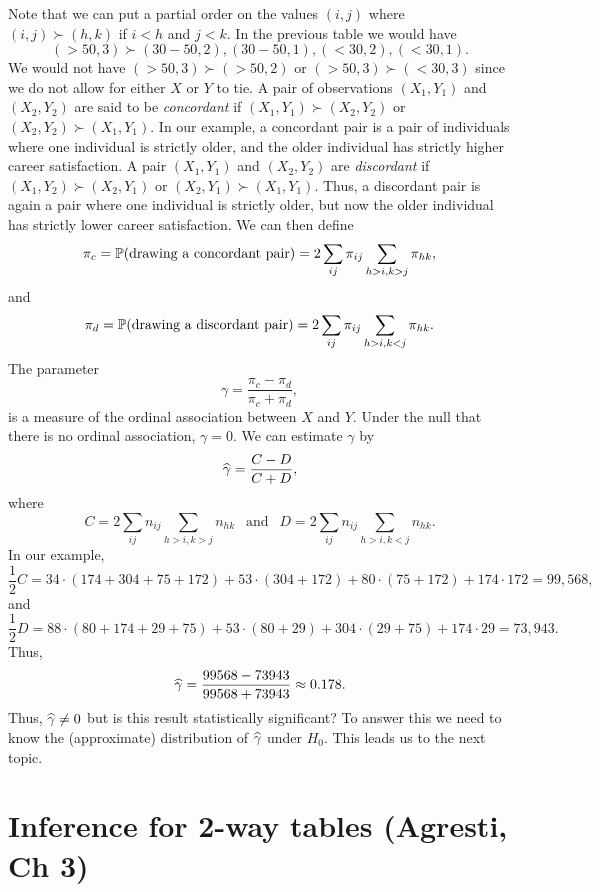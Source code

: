 Note that we can put a partial order on the values $(i,j)$ where $(i,j) \succ (h,k)$ if $i < h$ and $j < k$. In the previous table we would have 
\[(>50,3) \succ (30-50, 2), (30-50, 1), (<30, 2), (<30, 1). \]
We would not have $(>50,3) \succ (>50,2)$ or $(>50,3) \succ (<30,3)$ since we do not allow for either $X$ or $Y$ to tie. A pair of observations $(X_1,Y_1)$ and $(X_2,Y_2)$ are said to be \emph{concordant} if $(X_1,Y_1) \succ (X_2,Y_2)$ or $(X_2, Y_2) \succ (X_1,Y_1)$. In our example, a concordant pair is a pair of individuals where one individual is strictly older, and the older individual has strictly higher career satisfaction. A pair $(X_1,Y_1)$ and $(X_2,Y_2)$ are \emph{discordant} if $(X_1,Y_2) \succ (X_2, Y_1)$  or $(X_2, Y_1) \succ (X_1,Y_1)$. Thus, a discordant pair is again a pair where one individual is strictly older, but now the older individual has strictly lower career satisfaction. We can then define
\[\pi_c = {\mathbb{P}}(\text{drawing a concordant pair}) = 2\sum_{ij}\pi_{ij} \sum_{h>i,k>j}\pi_{hk},\]
and 
\[\pi_d = {\mathbb{P}}(\text{drawing a discordant pair}) = 2\sum_{ij}\pi_{ij} \sum_{h > i, k<j} \pi_{hk}. \]
The parameter
\[\gamma = \frac{\pi_c-\pi_d}{\pi_c+\pi_d}, \]
is a measure of the ordinal association between $X$ and $Y$. Under the null that there is no ordinal association, $\gamma = 0$. We can estimate $\gamma$ by 
\[\widehat{\gamma} = \frac{C-D}{C+D}, \]
where
\[C = 2\sum_{ij}n_{ij} \sum_{h>i,k>j}n_{hk} ~~\text{ and }~~ D = 2\sum_{ij}n_{ij} \sum_{h > i, k<j} n_{hk}.  \]
In our example,
\[\frac{1}{2}C = 34\cdot(174+304+75+172)+53\cdot(304+172)+80\cdot(75+172)+174\cdot 172 = 99,568,\]
and
\[\frac{1}{2}D = 88\cdot(80+174+29+75)+53\cdot(80+29)+304\cdot(29+75)+174\cdot29 = 73,943. \]
Thus,
\[\widehat{\gamma} = \frac{99568-73943}{99568+73943}\approx 0.178.  \]
Thus, $\widehat{\gamma} \neq 0$ but is this result statistically significant? To answer this we need to know the (approximate) distribution of $\widehat{\gamma}$ under $H_0$. This leads us to the next topic.
\section{Inference for 2-way tables (Agresti, Ch 3)}
